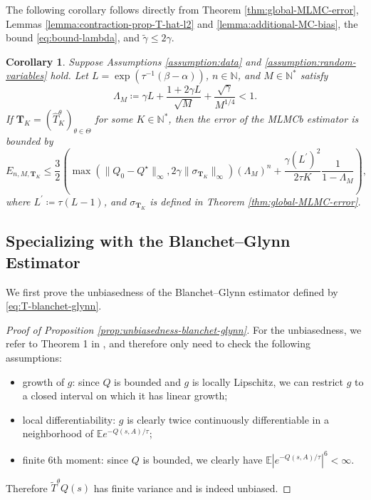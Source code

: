 \documentclass[11pt]{article}
\numberwithin{equation}{section}
\newtheorem{corollary}[theorem]{Corollary}
\theoremstyle{definition}
\theoremstyle{remark}
\def\N{{\mathbb{N}}}
\newcommand{\citet}{\cite}
\begin{document}
The following corollary follows directly from 
Theorem \ref{thm:global-MLMC-error}, Lemmas \ref{lemma:contraction-prop-T-hat-l2} and \ref{lemma:additional-MC-bias},
the  bound \eqref{eq:bound-lambda}, and $\tilde{\gamma} \leq 2 \gamma$.

\begin{corollary}
    \label{cor:error-plain-monte-carlo}
Suppose Assumptions \ref{assumption:data} and \ref{assumption:random-variables} hold.
Let $L = \exp \left(\tau^{-1} (\beta - \alpha)\right)$, 
 $n \in \N$, and $M \in \N^*$ satisfy
  \begin{equation}
    \label{eq:condition-M-MC}
      \Lambda_M \coloneqq \gamma L + \frac{1 + 2 \gamma L}{\sqrt{M}} + \frac{\sqrt{\gamma}}{M^{1/4}} < 1.
  \end{equation}
If $ \mathbf{T}_K = (\hat{T}^\theta_K)_{\theta \in \Theta}$ for some $K \in \N^*$, then the   error of the MLMCb estimator is   bounded by
    \begin{equation*}
        \label{eq:final-MLMC-error-plain-monte-carlo}
        E _{n,M, \mathbf{T}_K} \leq
        \frac{3}{2}\left(\max\left( \| Q_0 - Q^\star\|_{\infty},  2 \gamma \| \sigma_{ \mathbf{T}_K} \|_{\infty} \right) \left(\Lambda_M\right)^n + \frac{\gamma (L^\prime)^2}{2 \tau K}\frac{1 }{1 - \Lambda_M} \right),
    \end{equation*}
    where  $L^\prime \coloneqq   \tau ( L - 1 )$, and $  \sigma_{ \mathbf{T}_K}$ is defined  in Theorem \ref{thm:global-MLMC-error}.
   
\end{corollary}


\subsection{Specializing with the Blanchet--Glynn Estimator}
\label{subsection:specialising-error-BG}

We first prove the unbiasedness of the Blanchet--Glynn estimator defined by \eqref{eq:T-blanchet-glynn}.

\begin{proof}[Proof of Proposition \ref{prop:unbiasedness-blanchet-glynn}]
    
    For the unbiasedness, we refer to Theorem 1 in \citet{blanchet2015unbiased}, and therefore only need to check the following assumptions:
    \begin{itemize}
        \item growth of $g$: since $Q$ is bounded and $g$ is locally Lipschitz, we can restrict $g$ to a closed interval on which it has linear growth;
        \item local differentiability: $g$ is clearly twice continuously differentiable in a neighborhood of $\mathbb E e^{-Q(s,A)/ \tau}$;
        \item finite 6th moment: since $Q$ is bounded, we clearly have $\mathbb E |e^{-Q(s,A)/ \tau}|^6 < \infty$.
    \end{itemize}
    Therefore $\tilde{T}^\theta Q(s)$ has finite variance and is indeed unbiased.
\end{proof}
\end{document}
